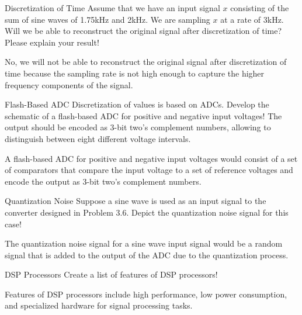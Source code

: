 \documentclass{article}
\begin{document}
\begin{exercise}{Discretization of Time}
  Assume that we have an input signal $x$ consisting of the sum of sine waves of 1.75kHz and 2kHz. We are sampling $x$ at a rate of 3kHz. Will we be able to reconstruct the original signal after discretization of time? Please explain your result!

  \begin{solution}
    No, we will not be able to reconstruct the original signal after discretization of time because the sampling rate is not high enough to capture the higher frequency components of the signal.
  \end{solution}
\end{exercise}

\begin{exercise}{Flash-Based ADC}
  Discretization of values is based on ADCs. Develop the schematic of a flash-based ADC for positive and negative input voltages! The output should be encoded as 3-bit two's complement numbers, allowing to distinguish between eight different voltage intervals.

  \begin{solution}
    A flash-based ADC for positive and negative input voltages would consist of a set of comparators that compare the input voltage to a set of reference voltages and encode the output as 3-bit two's complement numbers.
  \end{solution}
\end{exercise}

\begin{exercise}{Quantization Noise}
  Suppose a sine wave is used as an input signal to the converter designed in Problem 3.6. Depict the quantization noise signal for this case!

  \begin{solution}
    The quantization noise signal for a sine wave input signal would be a random signal that is added to the output of the ADC due to the quantization process.
  \end{solution}
\end{exercise}

\begin{exercise}{DSP Processors}
  Create a list of features of DSP processors!

  \begin{solution}
    Features of DSP processors include high performance, low power consumption, and specialized hardware for signal processing tasks.
  \end{solution}
\end{exercise}
\end{document}
